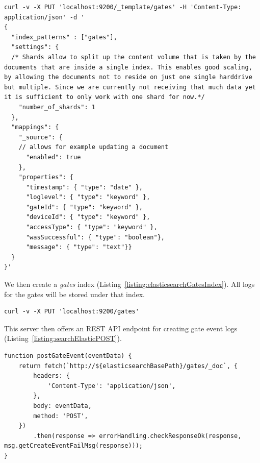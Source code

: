 \clearpage

\begin{lstlisting}[label={listing:curlScriptTemplateElastic},caption={cURL script for creating gates index template}]
curl -v -X PUT 'localhost:9200/_template/gates' -H 'Content-Type: application/json' -d '
{
  "index_patterns" : ["gates"],
  "settings": {
  /* Shards allow to split up the content volume that is taken by the documents that are inside a single index. This enables good scaling, by allowing the documents not to reside on just one single harddrive but multiple. Since we are currently not receiving that much data yet it is sufficient to only work with one shard for now.*/
    "number_of_shards": 1
  },
  "mappings": {
    "_source": {
    // allows for example updating a document
      "enabled": true
    },
    "properties": {
      "timestamp": { "type": "date" },
      "loglevel": { "type": "keyword" },
      "gateId": { "type": "keyword" },
      "deviceId": { "type": "keyword" },
      "accessType": { "type": "keyword" },
      "wasSuccessful": { "type": "boolean"},
      "message": { "type": "text"}}
  }
}'
\end{lstlisting}


We then create a \emph{gates} index (Listing~\ref{listing:elasticsearchGatesIndex}). All logs for the gates will be stored under that index.

\begin{lstlisting}[label={listing:elasticsearchGatesIndex},caption={cURL script for creating gates index}]
curl -v -X PUT 'localhost:9200/gates'
\end{lstlisting}

This server then offers an REST API endpoint for creating gate event logs (Listing~\ref{listing:searchElasticPOST}).

 \clearpage
 
\begin{lstlisting}[label={listing:searchElasticPOST},caption={Interface of Elasticsearch server to create gate event logs}]
function postGateEvent(eventData) {
    return fetch(`http://${elasticsearchBasePath}/gates/_doc`, {
        headers: {
            'Content-Type': 'application/json',
        },
        body: eventData,
        method: 'POST',
    })
        .then(response => errorHandling.checkResponseOk(response, msg.getCreateEventFailMsg(response)));
}
\end{lstlisting}

